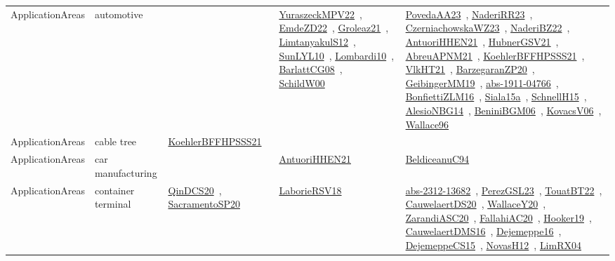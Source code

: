 {\begin{longtable}{lp{3cm}>{\raggedright\arraybackslash}p{6cm}>{\raggedright\arraybackslash}p{6cm}>{\raggedright\arraybackslash}p{8cm}}
ApplicationAreas & automotive &  & \href{works/YuraszeckMPV22.pdf}{YuraszeckMPV22}~\cite{YuraszeckMPV22}, \href{works/EmdeZD22.pdf}{EmdeZD22}~\cite{EmdeZD22}, \href{works/Groleaz21.pdf}{Groleaz21}~\cite{Groleaz21}, \href{works/LimtanyakulS12.pdf}{LimtanyakulS12}~\cite{LimtanyakulS12}, \href{works/SunLYL10.pdf}{SunLYL10}~\cite{SunLYL10}, \href{works/Lombardi10.pdf}{Lombardi10}~\cite{Lombardi10}, \href{works/BarlattCG08.pdf}{BarlattCG08}~\cite{BarlattCG08}, \href{works/SchildW00.pdf}{SchildW00}~\cite{SchildW00} & \href{works/PovedaAA23.pdf}{PovedaAA23}~\cite{PovedaAA23}, \href{works/NaderiRR23.pdf}{NaderiRR23}~\cite{NaderiRR23}, \href{works/CzerniachowskaWZ23.pdf}{CzerniachowskaWZ23}~\cite{CzerniachowskaWZ23}, \href{works/NaderiBZ22.pdf}{NaderiBZ22}~\cite{NaderiBZ22}, \href{works/AntuoriHHEN21.pdf}{AntuoriHHEN21}~\cite{AntuoriHHEN21}, \href{works/HubnerGSV21.pdf}{HubnerGSV21}~\cite{HubnerGSV21}, \href{works/AbreuAPNM21.pdf}{AbreuAPNM21}~\cite{AbreuAPNM21}, \href{works/KoehlerBFFHPSSS21.pdf}{KoehlerBFFHPSSS21}~\cite{KoehlerBFFHPSSS21}, \href{works/VlkHT21.pdf}{VlkHT21}~\cite{VlkHT21}, \href{works/BarzegaranZP20.pdf}{BarzegaranZP20}~\cite{BarzegaranZP20}, \href{works/GeibingerMM19.pdf}{GeibingerMM19}~\cite{GeibingerMM19}, \href{works/abs-1911-04766.pdf}{abs-1911-04766}~\cite{abs-1911-04766}, \href{works/BonfiettiZLM16.pdf}{BonfiettiZLM16}~\cite{BonfiettiZLM16}, \href{works/Siala15a.pdf}{Siala15a}~\cite{Siala15a}, \href{works/SchnellH15.pdf}{SchnellH15}~\cite{SchnellH15}, \href{works/AlesioNBG14.pdf}{AlesioNBG14}~\cite{AlesioNBG14}, \href{works/BeniniBGM06.pdf}{BeniniBGM06}~\cite{BeniniBGM06}, \href{works/KovacsV06.pdf}{KovacsV06}~\cite{KovacsV06}, \href{works/Wallace96.pdf}{Wallace96}~\cite{Wallace96}\\
ApplicationAreas & cable tree & \href{works/KoehlerBFFHPSSS21.pdf}{KoehlerBFFHPSSS21}~\cite{KoehlerBFFHPSSS21} &  & \\
ApplicationAreas & car manufacturing &  & \href{works/AntuoriHHEN21.pdf}{AntuoriHHEN21}~\cite{AntuoriHHEN21} & \href{works/BeldiceanuC94.pdf}{BeldiceanuC94}~\cite{BeldiceanuC94}\\
ApplicationAreas & container terminal & \href{works/QinDCS20.pdf}{QinDCS20}~\cite{QinDCS20}, \href{works/SacramentoSP20.pdf}{SacramentoSP20}~\cite{SacramentoSP20} & \href{works/LaborieRSV18.pdf}{LaborieRSV18}~\cite{LaborieRSV18} & \href{works/abs-2312-13682.pdf}{abs-2312-13682}~\cite{abs-2312-13682}, \href{works/PerezGSL23.pdf}{PerezGSL23}~\cite{PerezGSL23}, \href{works/TouatBT22.pdf}{TouatBT22}~\cite{TouatBT22}, \href{works/CauwelaertDS20.pdf}{CauwelaertDS20}~\cite{CauwelaertDS20}, \href{works/WallaceY20.pdf}{WallaceY20}~\cite{WallaceY20}, \href{works/ZarandiASC20.pdf}{ZarandiASC20}~\cite{ZarandiASC20}, \href{works/FallahiAC20.pdf}{FallahiAC20}~\cite{FallahiAC20}, \href{works/Hooker19.pdf}{Hooker19}~\cite{Hooker19}, \href{works/CauwelaertDMS16.pdf}{CauwelaertDMS16}~\cite{CauwelaertDMS16}, \href{works/Dejemeppe16.pdf}{Dejemeppe16}~\cite{Dejemeppe16}, \href{works/DejemeppeCS15.pdf}{DejemeppeCS15}~\cite{DejemeppeCS15}, \href{works/NovasH12.pdf}{NovasH12}~\cite{NovasH12}, \href{works/LimRX04.pdf}{LimRX04}~\cite{LimRX04}\\

\end{longtable}}
